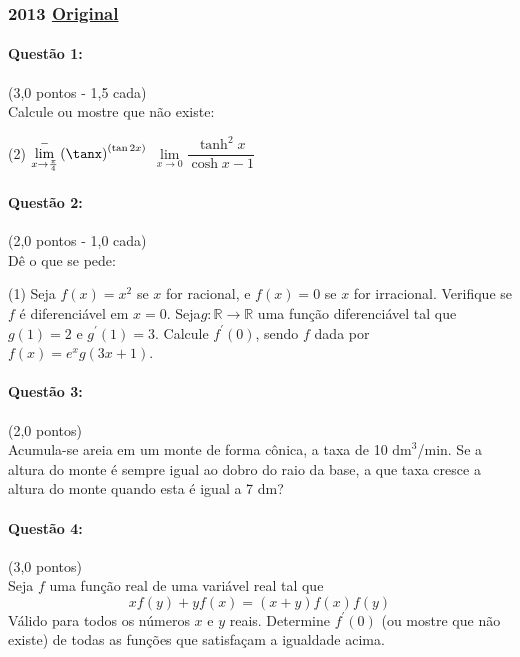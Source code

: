 \documentclass[12pt,a4paper]{article}
\newcommand{\R}{\mathbb{R}}
\newcommand{\original}[1]{\tiny \href{#1}{Original} \normalsize}
\begin{document}
\newpage

\subsubsection{2013  \original{https://drive.google.com/file/d/1CqLJEQ23GQSyvgVnIj5N87Fysyl9ZtSt/view?usp=sharing}}

\paragraph{Questão 1: }(3,0 pontos - 1,5 cada)\\
Calcule ou mostre que não existe:
\begin{tasks}(2)
    \task $\lim\limits_{x\to \frac{\pi}{4}}^{-} \left(\tanx\right)^{(\tan2x)}$
    \task $\lim\limits_{x\to 0} \dfrac{\tanh^2{x}}{\cosh x - 1}$
\end{tasks}

\paragraph{Questão 2: }(2,0 pontos - 1,0 cada)\\
Dê o que se pede:
\begin{tasks}(1)
\task Seja $f(x)= x^2$ se $x$ for racional, e $f(x) = 0$ se $x$ for irracional. Verifique se $f$ é diferenciável em $x=0$.
\task Seja$g: \R \to \R$ uma função diferenciável tal que $g(1) = 2$ e $g^{\prime}(1) = 3$. Calcule $f^{\prime}(0)$, sendo $f$ dada por $f(x) = e^x g(3x+1)$.
\end{tasks}

\paragraph{Questão 3: }(2,0 pontos)\\
Acumula-se areia em um monte de forma cônica, a taxa de 10 $\mathrm{dm}^3$/min. Se a altura do monte é sempre igual ao dobro do raio da base, a que taxa cresce a altura do monte quando esta é igual a 7 dm?

\paragraph{Questão 4: }(3,0 pontos)\\
Seja $f$ uma função real de uma variável real tal que 
$$xf(y) + yf(x) = (x+y)f(x)f(y)$$
Válido para todos os números $x$ e $y$ reais.
Determine $f^{\prime}(0)$ (ou mostre que não existe) de todas as funções que satisfaçam a igualdade acima.
\end{document}
